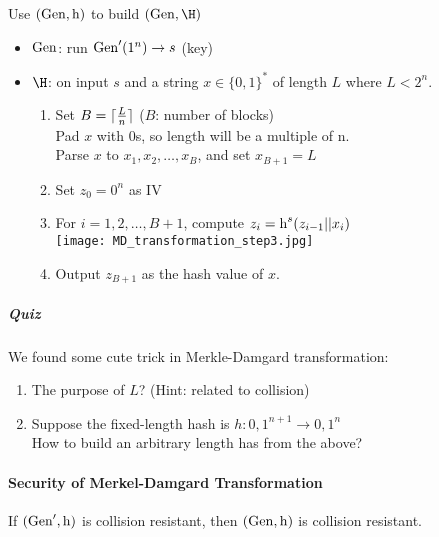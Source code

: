 Use \((\operatorname{Gen}, \operatorname{\mathrm{h}})\) to build \((\Gen, \H)\)
\begin{itemize}
	\item \(\operatorname{Gen}\): run \(\operatorname{Gen}'(1^n) \rightarrow s\) (key)
	\item \(\H\): on input \(s\) and a string \(x \in \{0, 1\}^\ast\) of length \(L\) where \(L < 2^n\).
		\begin{enumerate}[label=(\roman*)]
			\item Set \(B = \lceil\frac{L}{n}\rceil\) (\(B\): number of blocks) \\
				Pad \(x\) with \(0\)s, so length will be a multiple of n. \\
				Parse \(x\) to \(x_1, x_2, \ldots, x_B\), and set \(x_{B+1} = L\)
			\item Set \(z_0 = 0^n\) as IV
			\item For \(i = 1, 2, \ldots, B+1\), compute \(z_i = \operatorname{\mathrm{h}}^s(z_{i-1} || x_i)\) \\
				\texttt{[image: MD\_transformation\_step3.jpg]}
			\item Output \(z_{B+1}\) as the hash value of \(x\).
		\end{enumerate}
\end{itemize}

\subparagraph{Quiz}

We found some cute trick in Merkle-Damgard transformation:
\begin{enumerate}[label=(\roman*)]
	\item The purpose of \(L\)? (Hint: related to collision)
	\item Suppose the fixed-length hash is \(h:{0, 1}^{n+1} \rightarrow {0, 1}^n\) \\
		How to build an arbitrary length has from the above?
\end{enumerate}


\paragraph{Security of Merkel-Damgard Transformation}

\begin{theorem}
	If \((\operatorname{Gen}', \operatorname{\mathrm{h}})\) is collision resistant, then \((\operatorname{Gen}, \operatorname{\mathrm{h}})\) is collision resistant.
\end{theorem}

